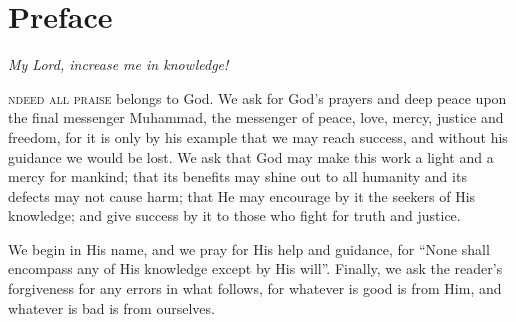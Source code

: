  \chapter*{Preface}

\textsf{\textsl{My Lord, increase me in knowledge!}}
\newline

\textsc{ndeed all praise} belongs to God. We ask for God's prayers and deep peace upon the final 
messenger Muhammad, the messenger of peace, love, mercy, justice and freedom, for it is only by his example that we may reach success, and without his guidance we would be lost. We ask that God may make this work a light and a mercy for mankind; that its benefits may shine out to all humanity and its defects may not cause harm; that He may encourage by it the seekers of His knowledge; and give success by it to those who fight for truth and justice.
 
 We begin in His name, and we pray for His help and guidance, for ``None shall encompass any of His knowledge except by His will''.  Finally, we ask the reader's forgiveness for any errors in what follows, for whatever is good is from Him, and whatever is bad is from ourselves.  